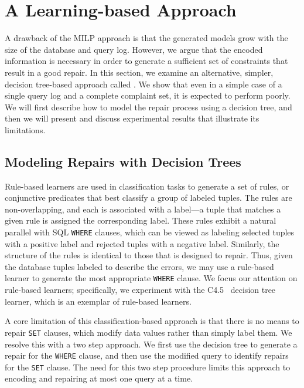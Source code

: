 \newpage
\appendix

\section{A Learning-based Approach}
\label{sec:heuristic}
  
A drawback of the MILP approach is that the generated models grow with the 
size of the database and query log.
However, we argue that the encoded information is necessary in order to generate a sufficient set of constraints that result in a good repair.
In this section, we examine an alternative, simpler, decision tree-based approach called \dt. 
We show that even in a simple case of a single query log and a complete complaint set, it is expected to perform poorly.
We will first describe how to model the repair process using a decision tree,
and then we will present and discuss experimental results that illustrate its limitations.

\subsection{Modeling Repairs with Decision Trees}

Rule-based learners are used in classification tasks to generate a set of rules, or conjunctive predicates that best classify a group of labeled tuples.
The rules are non-overlapping, and each is associated with a label---a tuple that matches a given rule is assigned the corresponding label.
These rules exhibit a natural parallel with SQL \texttt{WHERE} clauses, 
which can be viewed as labeling selected tuples with a positive label and rejected tuples with a negative label.
Similarly, the structure of the rules is identical to those that \sys is designed to repair.
Thus, given the database tuples labeled to describe the errors, we may use a rule-based learner to
generate the most appropriate \texttt{WHERE} clause.
We focus our attention on rule-based learners;
specifically, we experiment with the C4.5~\cite{quinlan1987} decision tree learner, which is an 
exemplar of rule-based learners.

A core limitation of this classification-based approach is that there is no means to 
repair \texttt{SET} clauses, which modify data values rather than simply label them.
We resolve this with a two step approach.
We first use the decision tree to generate a repair for the
\texttt{WHERE} clause, and then use the modified query to identify repairs for the \texttt{SET} clause.
The need for this two step procedure limits this approach to encoding and repairing at most one query
at a time.

